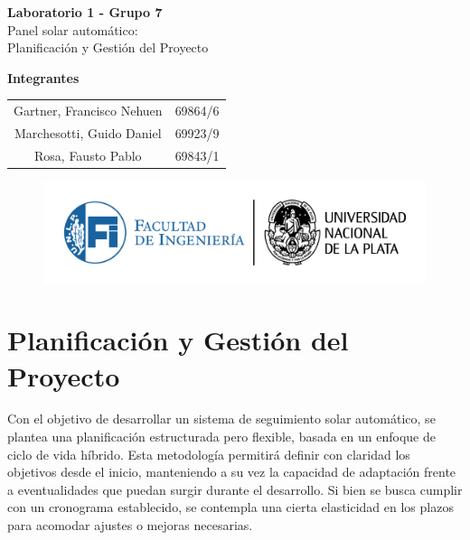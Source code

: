 \documentclass[a4paper,12pt]{article}
\begin{document}
\begin{titlepage}
    \begin{center}
        \vspace*{3cm}
        
        {\Huge \textbf{Laboratorio 1 - Grupo 7}}\\[1cm]
        {\LARGE Panel solar automático:\\ [0.5cm]Planificación y Gestión del Proyecto}\\[2cm]
        
        \vfill
        
        {\Large \textbf{Integrantes}}\\[.5cm]
        \large
        \begin{tabular}{c c}
            Gartner, Francisco Nehuen & 69864/6 \\
            Marchesotti, Guido Daniel & 69923/9 \\
            Rosa, Fausto Pablo & 69843/1 \\
        \end{tabular}
        
        \vspace{1cm}
        
        \begin{figure}[b]
            \centering
            \includegraphics[width=1\linewidth]{LOGOSFI-UNLP-color-01.png}
        \end{figure}
        
    \end{center}
\end{titlepage}

\newpage


\section{Planificación y Gestión del Proyecto}

Con el objetivo de desarrollar un sistema de seguimiento solar automático, se plantea una planificación estructurada pero flexible, basada en un enfoque de ciclo de vida híbrido. Esta metodología permitirá definir con claridad los objetivos desde el inicio, manteniendo a su vez la capacidad de adaptación frente a eventualidades que puedan surgir durante el desarrollo. Si bien se busca cumplir con un cronograma establecido, se contempla una cierta elasticidad en los plazos para acomodar ajustes o mejoras necesarias.\\
\end{document}
